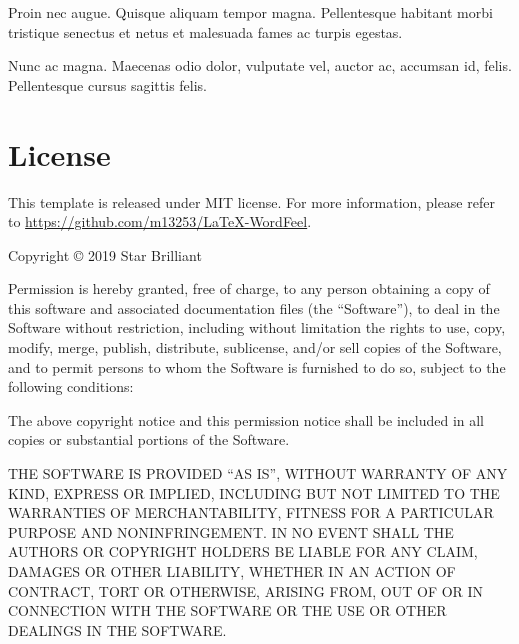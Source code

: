 \documentclass[letterpaper]{wordfeel}
\begin{document}
Proin nec augue. Quisque aliquam tempor magna. Pellentesque habitant morbi tristique senectus et netus et malesuada fames ac turpis egestas.

Nunc ac magna. Maecenas odio dolor, vulputate vel, auctor ac, accumsan id, felis. Pellentesque cursus sagittis felis.

\section{License}

This template is released under MIT license. For more information, please refer to \url{https://github.com/m13253/LaTeX-WordFeel}.

Copyright © 2019 Star Brilliant

Permission is hereby granted, free of charge, to any person obtaining a copy of this software and associated documentation files (the ``Software''), to deal in the Software without restriction, including without limitation the rights to use, copy, modify, merge, publish, distribute, sublicense, and/or sell copies of the Software, and to permit persons to whom the Software is furnished to do so, subject to the following conditions:

The above copyright notice and this permission notice shall be included in all copies or substantial portions of the Software.

THE SOFTWARE IS PROVIDED ``AS IS'', WITHOUT WARRANTY OF ANY KIND, EXPRESS OR IMPLIED, INCLUDING BUT NOT LIMITED TO THE WARRANTIES OF MERCHANTABILITY, FITNESS FOR A PARTICULAR PURPOSE AND NONINFRINGEMENT. IN NO EVENT SHALL THE AUTHORS OR COPYRIGHT HOLDERS BE LIABLE FOR ANY CLAIM, DAMAGES OR OTHER LIABILITY, WHETHER IN AN ACTION OF CONTRACT, TORT OR OTHERWISE, ARISING FROM, OUT OF OR IN CONNECTION WITH THE SOFTWARE OR THE USE OR OTHER DEALINGS IN THE SOFTWARE.
\end{document}
